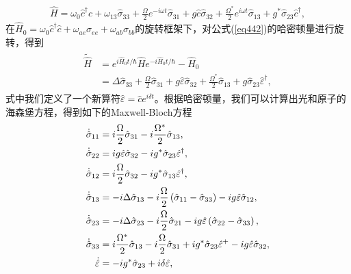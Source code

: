 \begin{align}
\hat H = {\omega _0}{\hat c^\dag }c + {\omega _{13}}{\hat \sigma _{33}} + \frac{\Omega }{2}{e^{ - i\omega t}}{\hat \sigma _{31}} + g\hat c{\hat \sigma _{32}} + \frac{{{\Omega ^*}}}{2}{e^{i\omega t}}{\hat \sigma _{13}} + {g^*}{\hat \sigma _{23}}{\hat c^\dag },\label{eq442}
\end{align}
在$\hat H_0= \omega_0\hat c^\dag \hat c + \omega_{ae}\sigma_{ee}+ \omega_{ab}\sigma_{bb}$的旋转框架下，对公式(\ref{eq442})的哈密顿量进行旋转，得到
\begin{align}\label{eq443}
\begin{split}
\tilde{ \hat{ H}} &= {e^{i{{\hat H}_0}t/\hbar }}\hat H{e^{ - i{{\hat H}_0}t/\hbar }} - {{\hat H}_0}\\
&= \Delta {{\hat \sigma }_{33}} + \frac{\Omega }{2}{{\hat \sigma }_{31}} + g\hat \varepsilon {{\hat \sigma }_{32}} + \frac{{{\Omega ^*}}}{2}{{\hat \sigma }_{13}} + g{{\hat \sigma }_{23}}{{\hat \varepsilon }^\dag },
\end{split}
\end{align}
式中我们定义了一个新算符$\hat \varepsilon  = \hat c{e^{i\delta t}}$。根据哈密顿量，我们可以计算出光和原子的海森堡方程，得到如下的Maxwell-Bloch方程
\begin{align}
{\dot {\hat {\sigma}} _{11}}& = i\frac{\Omega }{2}{\hat \sigma _{31}} - i\frac{{{\Omega ^*}}}{2}{\hat \sigma _{13}},\label{eq444}\\
{\dot {\hat {\sigma}} _{22}} &= ig\hat \varepsilon {\hat \sigma _{32}} - i{g^*}{\hat \sigma _{23}}{\hat \varepsilon ^\dag },\label{eq445}\\
{\dot {\hat {\sigma}} _{12}}& = i\frac{\Omega }{2}{\hat \sigma _{32}} - i{g^*}{\hat \sigma _{13}}{\hat \varepsilon ^\dag },\label{eq446}\\
{\dot {\hat {\sigma}} _{13}} &=  - i\Delta {\hat \sigma _{13}} - i\frac{\Omega }{2}\left( {{{\hat \sigma }_{11}} - {{\hat \sigma }_{33}}} \right) - ig\hat \varepsilon {\hat \sigma _{12}},\label{eq447}\\
{\dot {\hat {\sigma}} _{23}}& =  - i\Delta {\hat \sigma _{23}} - i\frac{\Omega }{2}{\hat \sigma _{21}} - ig\hat \varepsilon \left( {{{\hat \sigma }_{22}} - {{\hat \sigma }_{33}}} \right),\label{eq448}\\
{\dot {\hat {\sigma}} _{33}} &= i\frac{{{\Omega ^{\rm{*}}}}}{2}{\hat \sigma _{13}} - i\frac{\Omega }{2}{\hat \sigma _{31}} + i{g^{\rm{*}}}{\hat \sigma _{23}}{\hat \varepsilon ^ + } - ig\hat \varepsilon {\hat \sigma _{32}},\label{eq449}\\
\dot{ \hat{ \varepsilon}}  &=  - i{g^*}{\hat \sigma _{23}} + i\delta \hat \varepsilon ,\label{eq4410}
\end{align}
